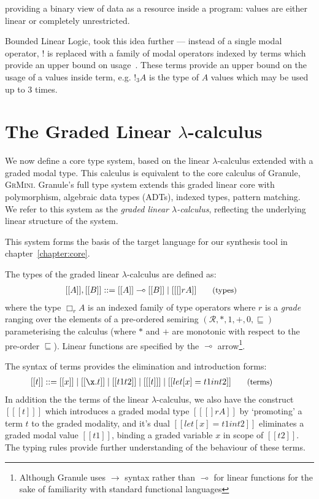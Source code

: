 providing a binary view of data as a
resource inside a program: values are either linear or completely unrestricted.

Bounded Linear Logic, took this idea further --- instead of a single modal
operator, $!$ is replaced with a family of modal operators indexed by terms
which provide an upper bound on usage~\cite{}. These terms provide an upper bound on
the usage of a values inside term, e.g. $!_{3}A$ is the type of $A$ values which
may be used up to 3 times.




\section{The Graded Linear $\lambda$-calculus}
\label{sec:linear-base}
We now define a core type system, based on the linear
$\lambda$-calculus extended with a graded modal type. 
This calculus is equivalent to the core calculus of Granule,
\textsc{GrMini}\cite{}. Granule's full type system extends this
graded linear core with polymorphism, algebraic data types (ADTs), indexed types, pattern
matching. We refer to this system as the \textit{graded linear $\lambda$-calculus}, reflecting the underlying
linear structure of the system.

This system forms the basis of the target language for our synthesis tool in
chapter~\ref{chapter:core}. 

The types of the graded linear $\lambda$-calculus are defined as:
\begin{align*}
\hspace{-0.9em}[[ A ]] , [[ B ]] & ::=
       [[ A ]] \multimap [[ B ]]
  \mid [[ [] r A ]]
{\small{\tag{types}}}
\end{align*}
where the type $\Box_{r} A$ is an indexed family of type operators where $r$ is a
\textit{grade} ranging over the elements of a pre-ordered semiring
$({\mathcal{R}}, {*}, {1}, {+}, {0},
{\sqsubseteq})$ parameterising the calculus (where $\ast$ and $+$
are monotonic with respect to the pre-order $\sqsubseteq$). Linear functions 
are specified by the $\multimap$ arrow\footnote{Although Granule uses $\rightarrow$ syntax rather than
$\multimap$ for linear functions for the sake of familiarity with
standard functional languages}.

The syntax of terms provides the elimination and introduction forms:
\begin{align*}
\hspace{-0.8em} [[ t ]] ::= \;
       & [[ x ]]
  \mid [[ \x . t ]]
  \mid [[ t1 t2 ]]
  \mid [[ [t] ]]
  \mid [[ let [ x ] = t1 in t2 ]]
{\small{\tag{terms}}}
\end{align*}
In addition the the terms of the linear $\lambda$-calculus, we also have the
construct $[[ [t] ]]$ which introduces a graded modal type $[[ [] r A
]]$ by `promoting' a term $t$ to the graded modality, and it's dual $[[ let [x] = t1
in t2 ]]$ eliminates a graded modal value $[[ t1 ]]$, binding a graded variable $x$
in scope of $[[ t2 ]]$. The typing rules provide further understanding of the
behaviour of these terms.

